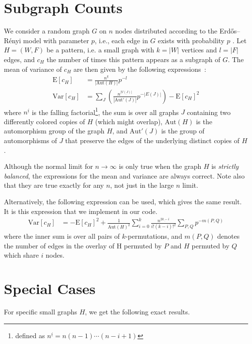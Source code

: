\documentclass{article}
\begin{document}
\section{Subgraph Counts}
We consider a random graph $G$ on $n$ nodes distributed according to the
Erdős--Rényi model with parameter $p$, i.e., each edge in $G$ exists with
probability $p$ \cite{b569}. Let $H=(W,F)$ be a pattern, i.e. a small graph with
$k=|W|$ vertices and $l=|F|$ edges, and $c_H$ the number of times this pattern
appears as a subgraph of $G$.  
The mean of variance of $c_H$ are then given by the following
expressions~\cite{gp6}:
\begin{align*}
  \mathrm{E}[c_H] &= \frac{n^{\underline{k}}}{|\mathrm{Aut}(H)|} p^{-l} \\
  \mathrm{Var}[c_H] &=
  \sum_J\left(
    \frac{n^{\underline{|V(J)|}}}{|\mathrm{Aut'}(J)|} p^{-|E(J)|} \right)
   - \mathrm{E}[c_H]^2
\end{align*}
where $n^{\underline{i}}$ is the falling factorial\footnote{defined
  as $n^{\underline{i}} = n (n-1) \cdots (n-i+1)$}, 
the sum is over all 
graphs $J$ containing two differently colored copies of $H$ (which might
overlap), 
$\mathrm{Aut}(H)$ is the automorphism group of the graph $H$, 
and $\mathrm{Aut'}(J)$ is the group of automorphisms of $J$ that preserve
the edges of the underlying distinct copies of $H$. 

Although the normal limit for $n \rightarrow \infty$ is only true when the
graph $H$ is \emph{strictly balanced}, the expressions for the mean and
variance are always correct.  Note also that they are true exactly for
any $n$, not just in the large $n$ limit.  

Alternatively, the following expression can be used, which gives the
same result.  It is this expression that we implement in our code.  
\begin{align*}
  \mathrm{Var}[c_H] &=
  - \mathrm{E}[c_H]^2 + \frac{1}{\mathrm{Aut}(H)^2}\sum_{i=0}^k
  \frac{n^{\underline{2k-i}}}{i!(k-i)!^2} 
  \sum_{P,Q} p^{-m(P,Q)}
\end{align*}
where the inner sum is over all pairs of $k$-permutations, and $m(P,Q)$
denotes the number of edges in the overlay of H permuted by $P$ and $H$
permuted by $Q$ which share $i$ nodes.

\section{Special Cases}
For specific small graphs $H$, we get the following exact results. 
\end{document}
